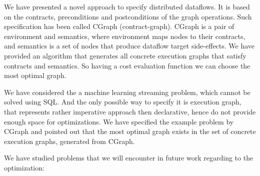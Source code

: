 We have presented a novel approach to specify distributed dataflows.
It is based on the contracts, preconditions and postconditions of the graph operations.
Such specification has been called CGraph (contract-graph).
CGraph is a pair of environment and semantics, where environment maps nodes to their contracts, and semantics is a set of nodes that produce dataflow target side-effects.
We have provided an algorithm that generates all concrete execution graphs that satisfy contracts and semantics.
So having a cost evaluation function we can choose the most optimal graph.

We have considered the a machine learning streaming problem, which cannot be solved using SQL. %
And the only possible way to specify it is execution graph, that represents rather imperative approach then declarative, hence do not provide enough space for optimizations.
We have specified the example problem by CGraph and pointed out that the most optimal graph exists in the set of concrete execution graphs, generated from CGraph.

We have studied problems that we will encounter in future work regarding to the optimization:
